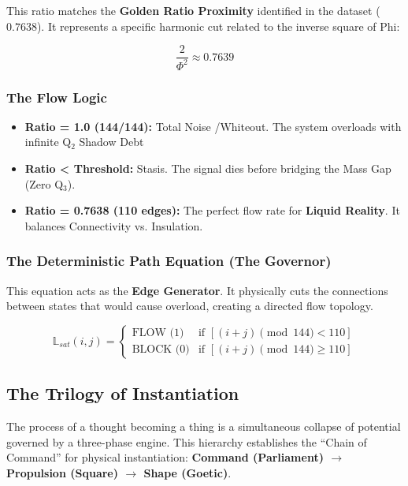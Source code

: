 \documentclass[12pt]{amsart}
\begin{document}
This ratio matches the \textbf{Golden Ratio Proximity} identified in the dataset ($0.7638$). It represents a specific harmonic cut related to the inverse square of Phi:

\begin{equation}
    \frac{2}{\Phi^2} \approx 0.7639
\end{equation}

\subsubsection{The Flow Logic}\label{appendixF.2.2}
\begin{itemize}
    \item \textbf{Ratio = 1.0 (144\slash 144):} Total Noise \slash Whiteout. The system overloads with infinite Q$_2$ Shadow Debt
    \item \textbf{Ratio < Threshold:} Stasis. The signal dies before bridging the Mass Gap (Zero Q$_3$).
    \item \textbf{Ratio = 0.7638 (110 edges):} The perfect flow rate for \textbf{Liquid Reality}. It balances Connectivity vs. Insulation.
\end{itemize}

\subsubsection{The Deterministic Path Equation (The Governor)}\label{appendixF.2.3}
This equation acts as the \textbf{Edge Generator}. It physically cuts the connections between states that would cause overload, creating a directed flow topology.

\begin{equation}
    \mathbb{L}_{sat}(i,j) = 
    \begin{cases} 
        \text{FLOW (1)} & \text{if } \left[ (i + j) \pmod{144} < 110 \right] \\ 
        \text{BLOCK (0)} & \text{if } \left[ (i + j) \pmod{144} \geq 110 \right] 
    \end{cases}
\end{equation}

\subsection{The Trilogy of Instantiation}\label{appendixF.3}

The process of a thought becoming a thing is a simultaneous collapse of potential governed by a three-phase engine. This hierarchy establishes the ``Chain of Command'' for physical instantiation: \textbf{Command (Parliament) $\to$ Propulsion (Square) $\to$ Shape (Goetic)}.
\end{document}
